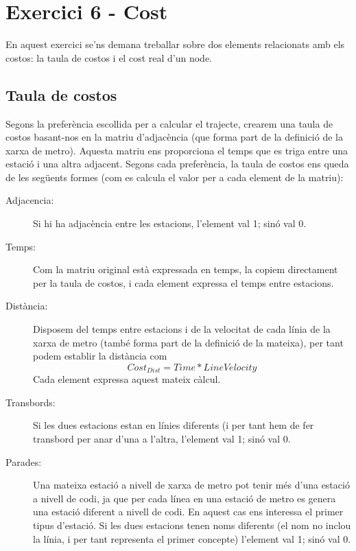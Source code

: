 \documentclass[a4paper,12pt,hidelinks]{article}
\begin{document}
        \section{Exercici 6 - Cost}
        \label{sec:Exercici6}

        En aquest exercici se'ns demana treballar sobre dos elements relacionats amb els costos: la taula de costos i el cost real d’un node.
        
            \subsection{Taula de costos}
            \label{subsec:Tauladecostos}

                Segons la preferència escollida per a calcular el trajecte, crearem una taula de costos basant-nos en la matriu d’adjacència (que forma part de la definició de la xarxa de metro). Aquesta matriu ens proporciona el temps que es triga entre una estació i una altra adjacent.
                Segons cada preferència, la taula de costos ens queda de les següents formes (com es calcula el valor per a cada element de la matriu):
                \begin{description}
                    \item[Adjacencia:] Si hi ha adjacència entre les estacions, l’element val 1; sinó val 0.
                    \item[Temps:] Com la matriu original està expressada en temps, la copiem directament per la taula de costos, i cada element expressa el temps entre estacions.
                    \item[Distància:] Disposem del temps entre estacions i de la velocitat de cada línia de la xarxa de metro (també forma part de la definició de la mateixa), per tant podem establir la distància com
                    \begin{equation*} \label{eq:cost_dist}
                        Cost_{Dist} = Time * LineVelocity
                    \end{equation*}
                    Cada element expressa aquest mateix càlcul.
                    \item[Transbords:] Si les dues estacions estan en línies diferents (i per tant hem de fer transbord per anar d’una a l’altra, l’element val 1; sinó val 0.
                    \item[Parades:] Una mateixa estació a nivell de xarxa de metro pot tenir més d’una estació a nivell de codi, ja que per cada línea en una estació de metro es genera una estació diferent a nivell de codi. En aquest cas ens interessa el primer tipus d’estació. Si les dues estacions tenen noms diferents (el nom no inclou la línia, i per tant representa el primer concepte) l’element val 1; sinó val 0. 
                \end{description}
            
\end{document}
